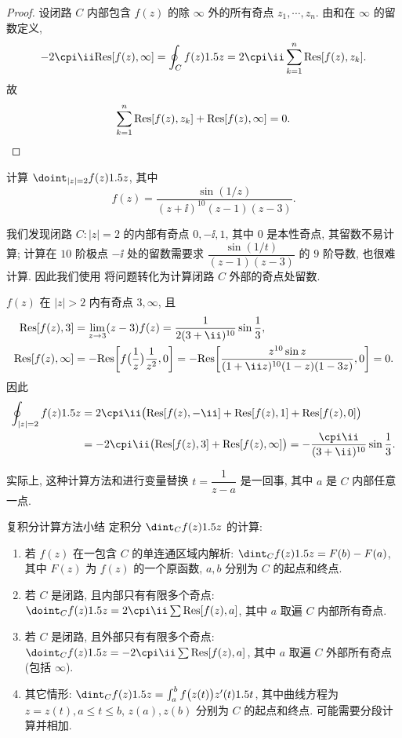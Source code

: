 \begin{proof}
  设闭路 $C$ 内部包含 $f(z)$ 的除 $\infty$ 外的所有奇点 $z_1,\cdots,z_n$.
  由\thmRes 和在 $\infty$ 的留数定义, 
  \[
     -2\cpi\ii\Res[f(z),\infty]
    =\oint_C f(z)\d z
    =2\cpi\ii\sum_{k=1}^n\Res[f(z),z_k].
  \]
  故
  \[
    \sum_{k=1}^n {\mathrm{Res}}[f(z),z_k]+{\mathrm{Res}}[f(z),\infty]=0.\qedhere
  \]
\end{proof}

\begin{example}
  计算 $\doint_{|z|=2}f(z)\d z$, 其中
  \[
    f(z)=\frac{\sin(1/z)}{(z+\ii)^{10}(z-1)(z-3)}.
  \]
\end{example}

我们发现闭路 $C:|z|=2$ 的内部有奇点 $0,-\ii,1$, 其中 $0$ 是本性奇点, 其留数不易计算; 计算在 $10$ 阶极点 $-\ii$ 处的留数需要求 $\dfrac{\sin(1/t)}{(z-1)(z-3)}$ 的 $9$ 阶导数, 也很难计算.
因此我们使用 将问题转化为计算闭路 $C$ 外部的奇点处留数.

\begin{solution}
  $f(z)$ 在 $|z|>2$ 内有奇点 $3,\infty$, 且
  \begin{align*}
     \Res[f(z),3]&
    =\lim_{z\ra3}(z-3)f(z)
    =\frac1{2(3+\ii)^{10}}\sin\frac13,\\
     \Res[f(z),\infty]&
    =-\Res\biggl[f\bigl(\frac1z\bigr)\frac1{z^2},0\biggr]
    =-\Res\biggl[\frac{z^{10}\sin z}{(1+\ii z)^{10}(1-z)(1-3z)},0\biggr]
    =0.
  \end{align*}
  因此
  \begin{align*}
     \oint_{|z|=2}f(z)\d z&
    =2\cpi\ii\bigl(\Res[f(z),-\ii]+\Res[f(z),1]+\Res[f(z),0]\bigr)\\&
    =-2\cpi\ii\bigl(\Res[f(z),3]+\Res[f(z),\infty]\bigr)
    =-\frac{\cpi\ii}{(3+\ii)^{10}}\sin\frac13.
  \end{align*}
\end{solution}

实际上, 这种计算方法和进行变量替换 $t=\dfrac1{z-a}$ 是一回事, 其中 $a$ 是 $C$ 内部任意一点.

\begin{fifth}{复积分计算方法小结}
  定积分 $\dint_Cf(z)\d z$ 的计算:
  \begin{enumerate}
    \item 若 $f(z)$ 在一包含 $C$ 的单连通区域内解析: 
    $\dint_C f(z)\d z=F(b)-F(a)$, 
    其中 $F(z)$ 为 $f(z)$ 的一个原函数, $a,b$ 分别为 $C$ 的起点和终点.
    \item 若 $C$ 是闭路, 且内部只有有限多个奇点: 
    $\doint_C f(z)\d z=2\cpi\ii\sum \Res[f(z),a]$, 
    其中 $a$ 取遍 $C$ 内部所有奇点.
    \item 若 $C$ 是闭路, 且外部只有有限多个奇点: 
    $\doint_C f(z)\d z=-2\cpi\ii\sum \Res[f(z),a]$, 
    其中 $a$ 取遍 $C$ 外部所有奇点(包括 $\infty$).
    \item 其它情形: 
    $\dint_Cf(z)\d z=\int_a^b f\bigl(z(t)\bigr)z'(t)\d t$, 
    其中曲线方程为 $z=z(t),a\le t\le b$, $z(a),z(b)$ 分别为 $C$ 的起点和终点. 可能需要分段计算并相加.
  \end{enumerate}
\end{fifth}

